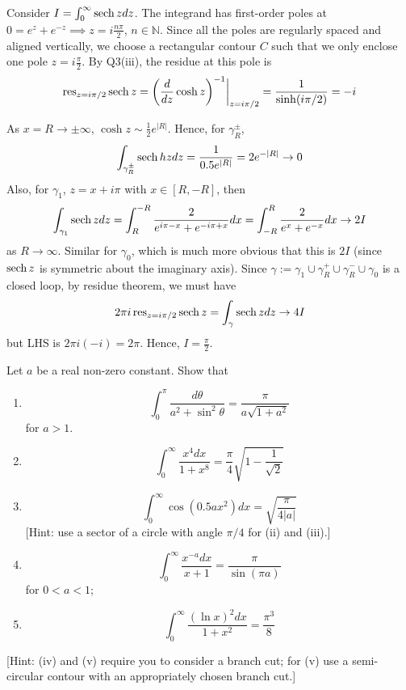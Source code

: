 \documentclass[a4paper]{article}
\begin{document}
\begin{ans}
Consider $I=\int_0^\infty\operatorname{sech} zdz$. The integrand has first-order poles at $0=e^{z}+e^{-z}\implies z=i\frac{n\pi}{2}$, $n\in\mathbb{N}$. Since all the poles are regularly spaced and aligned vertically, we choose a rectangular contour $C$ such that we only enclose one pole $z=i\frac{\pi}{2}$. By Q3(iii), the residue at this pole is
$$\operatorname{res}_{z=i\pi/2}\operatorname{sech} z=\bigg(\frac{d}{dz}\cosh z\bigg)^{-1}\bigg|_{z=i\pi/2}=\frac{1}{\sinh(i\pi/2)}=-i$$
  \begin{center}
  \end{center}
As $x=R\rightarrow\pm\infty$, $\cosh z\sim\frac{1}{2}e^{|R|}$. Hence, for $\gamma_R^{\pm}$,
$$\int_{\gamma_R^{\pm}}\operatorname{sech} hzdz=\frac{1}{0.5e^{|R|}}=2e^{-|R|}\rightarrow 0$$
Also, for $\gamma_1$, $z=x+i\pi$ with $x\in[R,-R]$, then
$$\int_{\gamma_1}\operatorname{sech} zdz=\int_{R}^{-R}\frac{2}{e^{i\pi -x}+e^{-i\pi+x}}dx=\int_{-R}^R\frac{2}{e^x+e^{-x}}dx\rightarrow 2I$$
as $R\rightarrow\infty$. Similar for $\gamma_0$, which is much more obvious that this is $2I$ (since $\operatorname{sech} z$ is symmetric about the imaginary axis). Since $\gamma:=\gamma_1\cup\gamma_R^+\cup\gamma_R^-\cup\gamma_0$ is a closed loop, by residue theorem, we must have
$$2\pi i\operatorname{res}_{z=i\pi/2}\operatorname{sech} z=\int_\gamma\operatorname{sech} zdz\rightarrow 4I$$
but LHS is $2\pi i(-i)=2\pi$. Hence, $I=\frac{\pi}{2}$.
\end{ans}
\newpage
\begin{qns}
Let $a$ be a real non-zero constant. Show that
\begin{enumerate}[label=(\roman*)]
\item 
$$\int_0^\pi\frac{d\theta}{a^2+\sin^2\theta}=\frac{\pi}{a\sqrt{1+a^2}}$$
for $a>1$.
\item 
$$\int_0^\infty\frac{x^4dx}{1+x^8}=\frac{\pi}{4}\sqrt{1-\frac{1}{\sqrt{2}}}$$
\item 
$$\int_0^\infty\cos(0.5ax^2)dx=\sqrt{\frac{\pi}{4|a|}}$$
[Hint: use a sector of a circle with angle $\pi/4$ for (ii) and (iii).] 
\item 
$$\int_0^\infty\frac{x^{-a}dx}{x+1}=\frac{\pi}{\sin(\pi a)}$$
for $0<a<1$;
\item 
$$\int_0^\infty\frac{(\ln x)^2dx}{1+x^2}=\frac{\pi^3}{8}$$
\end{enumerate}
[Hint: (iv) and (v) require you to consider a branch cut; for (v) use a semi-circular contour with an appropriately chosen branch cut.]
\end{qns}
\end{document}
